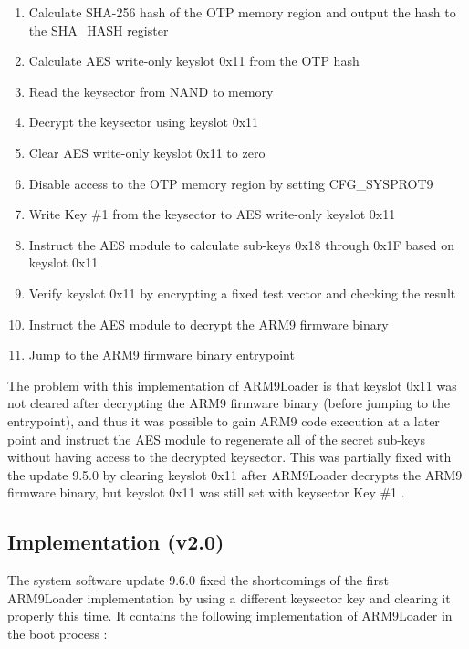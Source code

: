 \documentclass[journal]{IEEEtran}
\begin{document}
\medskip
\begin{enumerate}
  \item Calculate SHA-256 hash of the OTP memory region and output the hash to
  the SHA\_HASH register
  \item Calculate AES write-only keyslot 0x11 from the OTP hash
  \item Read the keysector from NAND to memory
  \item Decrypt the keysector using keyslot 0x11
  \item Clear AES write-only keyslot 0x11 to zero
  \item Disable access to the OTP memory region by setting CFG\_SYSPROT9
  \item Write Key \#1 from the keysector to AES write-only keyslot 0x11
  \item Instruct the AES module to calculate sub-keys 0x18 through 0x1F based on
  keyslot 0x11
  \item Verify keyslot 0x11 by encrypting a fixed test vector and checking the
  result
  \item Instruct the AES module to decrypt the ARM9 firmware binary
  \item Jump to the ARM9 firmware binary entrypoint
\end{enumerate}
\medskip

The problem with this implementation of ARM9Loader is that keyslot 0x11 was not
cleared after decrypting the ARM9 firmware binary (before jumping to the
entrypoint), and thus it was possible to gain ARM9 code execution at a later
point and instruct the AES module to regenerate all of the secret sub-keys
without having access to the decrypted keysector. This was partially fixed with
the update 9.5.0 by clearing keyslot 0x11 after ARM9Loader decrypts the ARM9
firmware binary, but keyslot 0x11 was still set with keysector Key \#1
\cite{3DS_System_Flaws}.

\subsection{Implementation (v2.0)}

The system software update 9.6.0 fixed the shortcomings of the first ARM9Loader
implementation by using a different keysector key and clearing it properly this
time. It contains the following implementation of ARM9Loader in the boot process
\cite{FIRM}:
\end{document}

